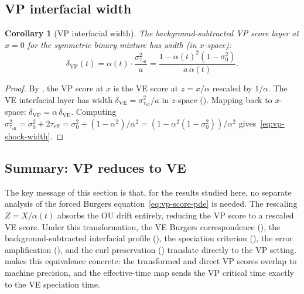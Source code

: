 \documentclass[11pt]{article}
\newtheorem{corollary}[theorem]{Corollary}
\begin{document}
\subsection{VP interfacial width}\label{sec:vp:profile}

\begin{corollary}[VP interfacial width]\label{cor:vp-shock}
The background-subtracted VP score layer at $x = 0$ for the symmetric binary mixture has width (in $x$-space):
\begin{equation}\label{eq:vp-shock-width}
  \delta_{\mathrm{VP}}(t)
  = \alpha(t) \cdot \frac{\sigma_{\tau_{\mathrm{eff}}}^2}{a}
  = \frac{1 - \alpha(t)^2(1 - \sigma_0^2)}{a\,\alpha(t)}.
\end{equation}
\end{corollary}

\begin{proof}
By , the VP score at $x$ is the VE score at $z = x/\alpha$ rescaled by $1/\alpha$.
The VE interfacial layer has width $\delta_{\mathrm{VE}} = \sigma_{\tau_{\mathrm{eff}}}^2/a$ in $z$-space ().
Mapping back to $x$-space: $\delta_{\mathrm{VP}} = \alpha\,\delta_{\mathrm{VE}}$.
Computing $\sigma_{\tau_{\mathrm{eff}}}^2 = \sigma_0^2 + 2\tau_{\mathrm{eff}} = \sigma_0^2 + (1-\alpha^2)/\alpha^2 = (1 - \alpha^2(1-\sigma_0^2))/\alpha^2$ gives~\eqref{eq:vp-shock-width}.
\end{proof}

\subsection{Summary: VP reduces to VE}\label{sec:vp:summary}

The key message of this section is that, for the results studied here, no separate analysis of the forced Burgers equation~\eqref{eq:vp-score-pde} is needed.
The rescaling $Z = X/\alpha(t)$ absorbs the OU drift entirely, reducing the VP score to a rescaled VE score.
Under this transformation, the VE Burgers correspondence (), the background-subtracted interfacial profile (), the speciation criterion (), the error amplification (), and the curl preservation () translate directly to the VP setting.
 makes this equivalence concrete: the transformed and direct VP scores overlap to machine precision, and the effective-time map sends the VP critical time exactly to the VE speciation time.
\end{document}
